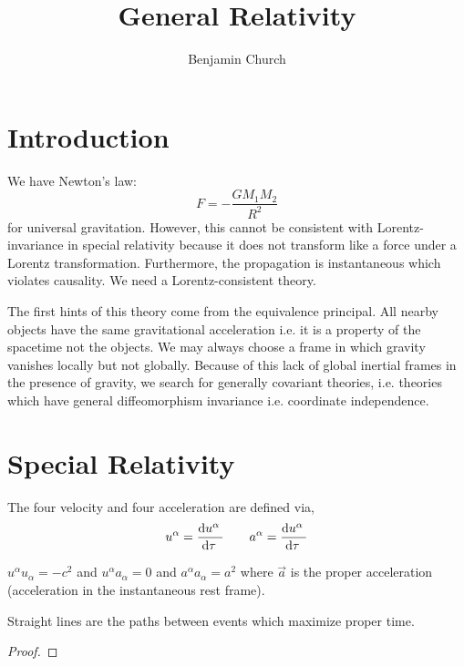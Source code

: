 \documentclass[11pt, a4paper]{article}
\begin{document}
\author{Benjamin Church}
\title{\Huge General Relativity}


\maketitle
\tableofcontents
\newpage

\section{Introduction}

We have Newton's law:
\[ F = - \frac{G M_1 M_2}{R^2} \]
for universal gravitation. However, this cannot be consistent with Lorentz-invariance in special relativity because it does not transform like a force under a Lorentz transformation. Furthermore, the propagation is instantaneous which violates causality. We need a Lorentz-consistent theory. 
\par
The first hints of this theory come from the equivalence principal. All nearby objects have the same gravitational acceleration i.e. it is a property of the spacetime not the objects. We may always choose a frame in which gravity vanishes locally but not globally. Because of this lack of global inertial frames in the presence of gravity, we search for generally covariant theories, i.e. theories which have general diffeomorphism invariance i.e. coordinate independence. 


\section{Special Relativity}

\begin{definition}
The four velocity and four acceleration are defined via,
\[ u^\alpha = \frac{\mathrm{d}u^\alpha \:}{\mathrm{d}\tau \:} \quad \quad a^\alpha = \frac{\mathrm{d}u^\alpha \:}{\mathrm{d}\tau \:} \]
\end{definition}

\begin{proposition}
$u^\alpha u_\alpha = - c^2$ and $u^\alpha a_\alpha = 0$ and $a^\alpha a_\alpha = a^2$ where $\vec{a}$ is the proper acceleration (acceleration in the instantaneous rest frame). 
\end{proposition}

\begin{theorem}
Straight lines are the paths between events which maximize proper time.
\end{theorem}

\begin{proof}

\end{proof}
 
\end{document}
